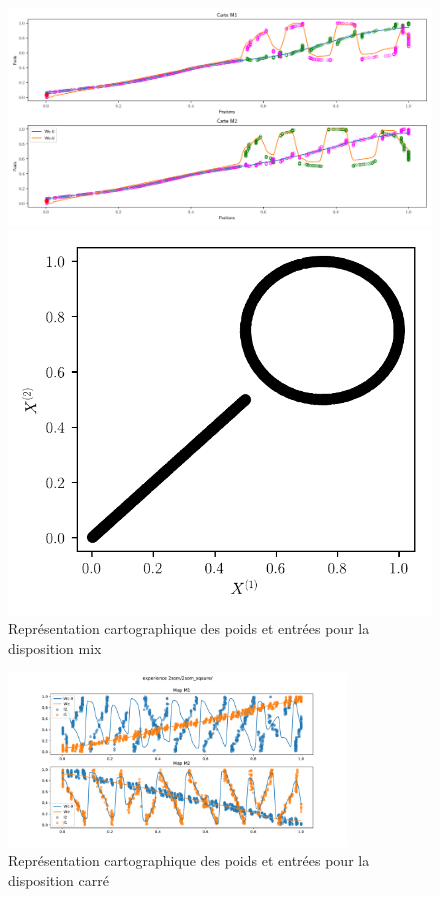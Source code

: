 \begin{figure}
	\begin{minipage}{0.66\textwidth}
		\includegraphics[width=\textwidth]{2som_mix_w.pdf}
	\caption{Représentation cartographique des poids et entrées pour la disposition mix}
	\end{minipage}
	\begin{minipage}{0.33\textwidth}
		\includegraphics[width=\textwidth]{2som_mix_in.pdf}
	\end{minipage}
\end{figure}

\begin{figure}
	\includegraphics[width=0.8\textwidth]{2som_square_w.pdf}
	\caption{Représentation cartographique des poids et entrées pour la disposition carré}
\end{figure}


